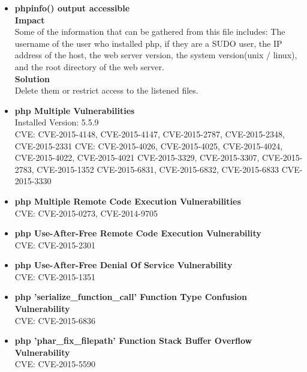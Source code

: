 \begin{itemize}
\item \textbf{phpinfo() output accessible}\\


\textbf{Impact}\\
Some of the information that can be gathered from this file includes: The username of the user who installed php, if they are a SUDO user, the IP address of the host, the web server version, the system version(unix / linux), and the root directory of the web server.\\

\textbf{Solution}\\
Delete them or restrict access to the listened files.\\

\item \textbf{php Multiple Vulnerabilities} \\
Installed Version: 5.5.9\\


CVE: CVE-2015-4148, CVE-2015-4147, CVE-2015-2787, CVE-2015-2348, CVE-2015-2331 CVE: CVE-2015-4026, CVE-2015-4025, CVE-2015-4024, CVE-2015-4022, CVE-2015-4021 CVE-2015-3329, CVE-2015-3307, CVE-2015-2783, CVE-2015-1352 CVE-2015-6831, CVE-2015-6832, CVE-2015-6833 CVE-2015-3330\\


\item \textbf{php Multiple Remote Code Execution Vulnerabilities} \\
CVE: CVE-2015-0273, CVE-2014-9705 \\


\item \textbf{php Use-After-Free Remote Code Execution Vulnerability } \\
CVE: CVE-2015-2301\\



\item \textbf{php Use-After-Free Denial Of Service Vulnerability} \\
CVE: CVE-2015-1351\\


\item \textbf{php 'serialize\_function\_call' Function Type Confusion Vulnerability} \\
CVE: CVE-2015-6836\\


\item \textbf{php 'phar\_fix\_filepath' Function Stack Buffer Overflow Vulnerability} \\
CVE: CVE-2015-5590\\



\end{itemize}
